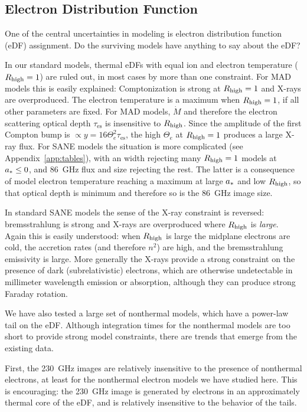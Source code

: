 \subsection{Electron Distribution Function}

One of the central uncertainties in modeling \sgra is electron distribution function (eDF) assignment.
Do the surviving models have anything to say about the eDF?

In our standard models, thermal eDFs with equal ion and electron temperature ($R_\mathrm{high} = 1$) are ruled out, in most cases by more than one constraint.
For MAD models this is easily explained: Comptonization is strong at $R_\mathrm{high} = 1$ and X-rays are overproduced.
The electron temperature is a maximum when $R_\mathrm{high} = 1$, if all other parameters are fixed.
For MAD models, $\dot{M}$ and therefore the electron scattering optical depth $\tau_\mathrm{es}$ is insensitive to $R_\mathrm{high}$.
Since the amplitude of the first Compton bump is $\propto y = 16 \Theta_e^2 \tau_\mathrm{es}$, the high $\Theta_e$ at $R_\mathrm{high} = 1$ produces a large X-ray flux.
For SANE models the situation is more complicated (see Appendix~\ref{app:tables}), with an \mring width rejecting many $R_\mathrm{high} = 1$ models at $a_* \le 0$, and 86~GHz flux and size rejecting the rest.
The latter is a consequence of model electron temperature reaching a maximum at large $a_*$ and low $R_\mathrm{high}$, so that optical depth is minimum and therefore so is the 86~GHz image size.

In standard SANE models the sense of the X-ray constraint is reversed: bremsstrahlung is strong and X-rays are overproduced where $R_\mathrm{high}$ is {\em large}.
Again this is easily understood: when $R_\mathrm{high}$ is large the midplane electrons are cold, the accretion rates (and therefore $n^2$) are high, and the bremsstrahlung emissivity is large.
More generally the X-rays provide a strong constraint on the presence of dark (subrelativistic) electrons, which are otherwise undetectable in millimeter wavelength emission or absorption, although they can produce strong Faraday rotation.

We have also tested a large set of nonthermal models, which have a power-law tail on the eDF.
Although integration times for the nonthermal models are too short to provide strong model constraints, there are trends that emerge from the existing data.

First, the 230~GHz images are relatively insensitive to the presence of nonthermal electrons, at least for the nonthermal electron models we have studied here.
This is encouraging: the 230~GHz image is generated by electrons in an approximately thermal core of the eDF, and is relatively insensitive to the behavior of the tails.

